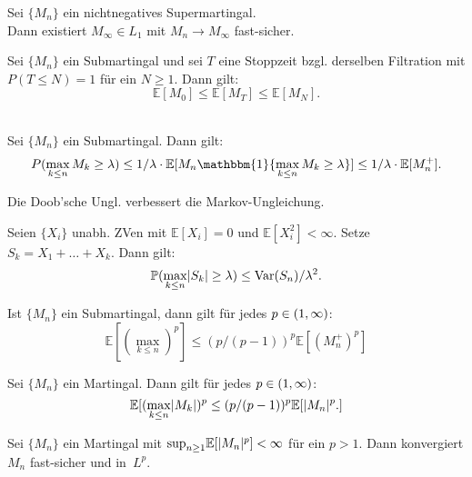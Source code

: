 \documentclass{cheat-sheet}
\renewcommand{\P}{\mathbb{P}} %
\newcommand{\E}{\mathbb{E}} %
\newcommand{\ind}{\mathbbm{1}} %
\DeclareMathOperator{\var}{Var} %
\begin{document}
\begin{kor}
  Sei $\{ M_n \}$ ein nichtnegatives Supermartingal. \\
  Dann existiert $M_\infty \in L_1$ mit $M_n \to M_\infty$ fast-sicher.
\end{kor}



\begin{satz}
  Sei $\{ M_n \}$ ein Submartingal und sei $T$ eine Stoppzeit bzgl. derselben Filtration mit $P(T \leq N) = 1$ für ein $N \geq 1$.
  Dann gilt:
  \[
    \E[M_0] \leq \E[M_T] \leq \E[M_N].
  \]
\end{satz}

\begin{satz} \mbox{}\\
  Sei $\{ M_n \}$ ein Submartingal.
  Dann gilt:
  \[
    P(\max_{k \leq n} M_k \geq \lambda) \leq 1/\lambda \cdot \E[ M_n \ind \{ \max_{k \leq n} M_k \geq \lambda \}] \leq 1/\lambda \cdot \E[ M_n^{+} ].
  \]
\end{satz}

\begin{bem}
  Die Doob'sche Ungl. verbessert die Markov-Ungleichung.
\end{bem}

\begin{kor}
  Seien $\{ X_i \}$ unabh. ZVen mit $\E[ X_i ] = 0$ und $\E[ X_i^2 ] < \infty$.
  Setze $S_k = X_1 + \ldots + X_k$.
  Dann gilt:
  \[ \P(\max_{k \leq n} \abs{S_k} \geq \lambda) \leq \var(S_n) / \lambda^2. \]
\end{kor}

\begin{satz}
  Ist $\{ M_n \}$ ein Submartingal, dann gilt für jedes $p \in \left( 1, \infty \right)$:
  \[
    \E[ (\max_{k \leq n})^p ] \leq (p / (p-1))^p \E[ (M_n^{+})^p ]
  \]
\end{satz}

\begin{kor}
  Sei $\{ M_n \}$ ein Martingal.
  Dann gilt für jedes $p \in \left( 1, \infty \right)$:
  \[
    \E[ (\max_{k \leq n} \abs{M_k})^p \leq (p / (p-1))^p \E[ \abs{M_n}^p. ]
  \]
\end{kor}


\begin{satz}
  Sei $\{ M_n \}$ ein Martingal mit ${\sup}_{n \geq 1} \E[\abs{M_n}^p] < \infty$ für ein $p > 1$.
  Dann konvergiert $M_n$ fast-sicher und in~$L^p$.
\end{satz}
\end{document}
